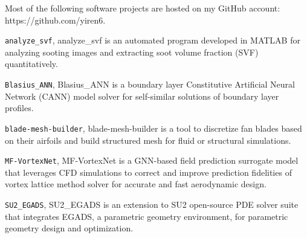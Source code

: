 
\begin{cvparagraph}
Most of the following software projects are hosted on my GitHub account: https://github.com/yiren6.
\end{cvparagraph}

\begin{cvitems}
\setlength{\itemsep}{1em} %
\paragraphstyle
\item \texttt{analyze\_svf}, analyze\_svf is an automated program developed in MATLAB for analyzing sooting images and extracting soot volume fraction (SVF) quantitatively. 

\item \texttt{Blasius\_ANN}, Blasius\_ANN is a boundary layer Constitutive Artificial Neural Network (CANN) model solver for self-similar solutions of boundary layer profiles. 

\item \texttt{blade-mesh-builder}, blade-mesh-builder is a tool to discretize fan blades based on their airfoils and build structured mesh for fluid or structural simulations. 

\item \texttt{MF-VortexNet}, MF-VortexNet is a GNN-based field prediction surrogate model that leverages CFD simulations to correct and improve prediction fidelities of vortex lattice method solver for accurate and fast aerodynamic design. 

\item \texttt{SU2\_EGADS}, SU2\_EGADS is an extension to SU2 open-source PDE solver suite that integrates EGADS, a parametric geometry environment, for parametric geometry design and optimization. 







\end{cvitems}